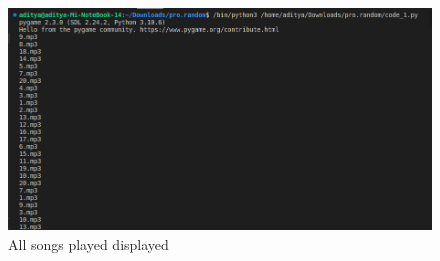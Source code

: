 \documentclass[journal,12pt,twocolumn]{IEEEtran}
\begin{document}
    \begin{figure}[h]
        \includegraphics[width=\columnwidth]{figs/img3.png}
        \caption{All songs played displayed}
        \label{output3}
    \end{figure}
    
\end{document}
